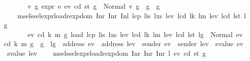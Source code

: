 \begin{isabellebody}
\ \ \ \ \ \ {\isasymLongrightarrow}\ {\isacharparenleft}{\kern0pt}{\isasymforall}v{}{\isacharprime}{\kern0pt}\ g{}{\isacharprime}{\kern0pt}{\isachardot}{\kern0pt}\ expr\ e{}\ ev{}\ cd{}\ st{}\ g{}\ {\isacharequal}{\kern0pt}\ Normal\ {\isacharparenleft}{\kern0pt}v{}{\isacharprime}{\kern0pt}{\isacharcomma}{\kern0pt}\ g{}{\isacharprime}{\kern0pt}{\isacharparenright}{\kern0pt}\ {\isasymlongrightarrow}\ g{}{\isacharprime}{\kern0pt}\ {\isasymle}\ g{}{\isacharparenright}{\kern0pt}{\isachardoublequoteclose}\isanewline
\ \ \ \ {\isachardoublequoteopen}msel{\isacharunderscore}{\kern0pt}ssel{\isacharunderscore}{\kern0pt}expr{\isacharunderscore}{\kern0pt}load{\isacharunderscore}{\kern0pt}rexp{\isacharunderscore}{\kern0pt}dom\ {\isacharparenleft}{\kern0pt}Inr\ {\isacharparenleft}{\kern0pt}Inr\ {\isacharparenleft}{\kern0pt}Inl\ {\isacharparenleft}{\kern0pt}lcp{\isacharcomma}{\kern0pt}\ lis{\isacharcomma}{\kern0pt}\ lxs{\isacharcomma}{\kern0pt}\ lev{}{\isacharcomma}{\kern0pt}\ lcd{}{\isacharcomma}{\kern0pt}\ lk{\isacharcomma}{\kern0pt}\ lm{\isacharcomma}{\kern0pt}\ lev{\isacharcomma}{\kern0pt}\ lcd{\isacharcomma}{\kern0pt}\ lst{\isacharcomma}{\kern0pt}\ lg{\isacharparenright}{\kern0pt}{\isacharparenright}{\kern0pt}{\isacharparenright}{\kern0pt}{\isacharparenright}{\kern0pt}\isanewline
\ \ \ \ \ \ {\isasymLongrightarrow}\ {\isacharparenleft}{\kern0pt}{\isasymforall}ev\ cd\ k\ m\ g{\isacharprime}{\kern0pt}{\isachardot}{\kern0pt}\ load\ lcp\ lis\ lxs\ lev{}\ lcd{}\ lk\ lm\ lev\ lcd\ lst\ lg\ {\isacharequal}{\kern0pt}\ Normal\ {\isacharparenleft}{\kern0pt}{\isacharparenleft}{\kern0pt}ev{\isacharcomma}{\kern0pt}\ cd{\isacharcomma}{\kern0pt}\ k{\isacharcomma}{\kern0pt}\ m{\isacharparenright}{\kern0pt}{\isacharcomma}{\kern0pt}\ g{\isacharprime}{\kern0pt}{\isacharparenright}{\kern0pt}\ {\isasymlongrightarrow}\ g{\isacharprime}{\kern0pt}\ {\isasymle}\ lg\ {\isasymand}\ address\ ev\ {\isacharequal}{\kern0pt}\ address\ lev{}\ {\isasymand}\ sender\ ev\ {\isacharequal}{\kern0pt}\ sender\ lev{}\ {\isasymand}\ svalue\ ev\ {\isacharequal}{\kern0pt}\ svalue\ lev{}{\isacharparenright}{\kern0pt}{\isachardoublequoteclose}\isanewline
\ \ \ \ {\isachardoublequoteopen}msel{\isacharunderscore}{\kern0pt}ssel{\isacharunderscore}{\kern0pt}expr{\isacharunderscore}{\kern0pt}load{\isacharunderscore}{\kern0pt}rexp{\isacharunderscore}{\kern0pt}dom\ {\isacharparenleft}{\kern0pt}Inr\ {\isacharparenleft}{\kern0pt}Inr\ {\isacharparenleft}{\kern0pt}Inr\ {\isacharparenleft}{\kern0pt}l{}{\isacharcomma}{\kern0pt}\ ev{}{\isacharcomma}{\kern0pt}\ cd{}{\isacharcomma}{\kern0pt}\ st{}{\isacharcomma}{\kern0pt}\ g{}{\isacharparenright}{\kern0pt}{\isacharparenright}{\kern0pt}{\isacharparenright}{\kern0pt}{\isacharparenright}{\kern0pt}\isanewline

\end{isabellebody}
